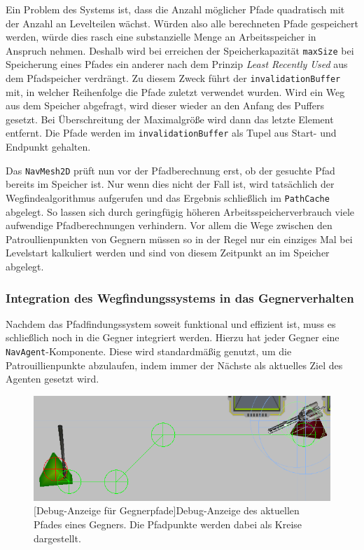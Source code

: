 Ein Problem des Systems ist, dass die Anzahl möglicher Pfade quadratisch mit der Anzahl an Levelteilen wächst. Würden also alle berechneten Pfade gespeichert werden, würde dies rasch eine substanzielle Menge an Arbeitsspeicher in Anspruch nehmen. Deshalb wird bei erreichen der Speicherkapazität \texttt{maxSize} bei Speicherung eines Pfades ein anderer nach dem Prinzip \textit{Least Recently Used} aus dem Pfadspeicher verdrängt. Zu diesem Zweck führt der \texttt{invalidationBuffer} mit, in welcher Reihenfolge die Pfade zuletzt verwendet wurden. Wird ein Weg aus dem Speicher abgefragt, wird dieser wieder an den Anfang des Puffers gesetzt. Bei Überschreitung der Maximalgröße wird dann das letzte Element entfernt. Die Pfade werden im \texttt{invalidationBuffer} als Tupel aus Start- und Endpunkt gehalten.

Das \texttt{NavMesh2D} prüft nun vor der Pfadberechnung erst, ob der gesuchte Pfad bereits im Speicher ist. Nur wenn dies nicht der Fall ist, wird tatsächlich der Wegfindealgorithmus aufgerufen und das Ergebnis schließlich im \texttt{PathCache} abgelegt. So lassen sich durch geringfügig höheren Arbeitsspeicherverbrauch viele aufwendige Pfadberechnungen verhindern. Vor allem die Wege zwischen den Patroullienpunkten von Gegnern müssen so in der Regel nur ein einziges Mal bei Levelstart kalkuliert werden und sind von diesem Zeitpunkt an im Speicher abgelegt.

\subsubsection{Integration des Wegfindungssystems in das Gegnerverhalten}\label{sec:pathfindingIntegration}
Nachdem das Pfadfindungssystem soweit funktional und effizient ist, muss es schließlich noch in die Gegner integriert werden. Hierzu hat jeder Gegner eine \texttt{NavAgent}-Komponente. Diese wird standardmäßig genutzt, um die Patrouillienpunkte abzulaufen, indem immer der Nächste als aktuelles Ziel des Agenten gesetzt wird.

\begin{figure}[h]
 \centering
 \includegraphics[width=0.7\linewidth]{pics/path_gizmo.png}
 [Debug-Anzeige für Gegnerpfade]{Debug-Anzeige des aktuellen Pfades eines Gegners. Die Pfadpunkte werden dabei als Kreise dargestellt.}
	\label{fig:pathGizmo}
\end{figure}

